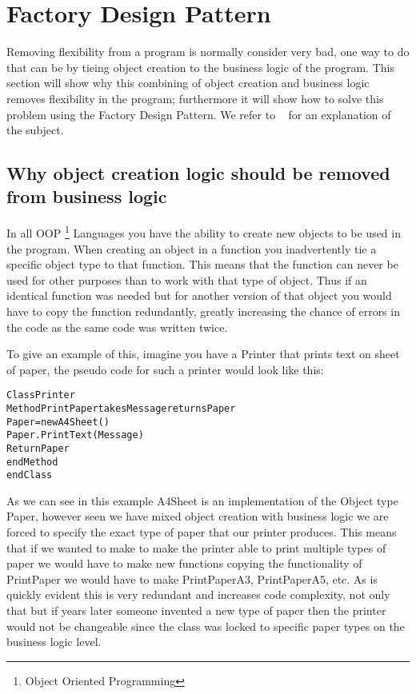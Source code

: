 
\section{Factory Design Pattern}

Removing flexibility from a program is normally consider very bad,
one way to do that can be by tieing object creation to the business
logic of the program. This section will show why this combining of
object creation and business logic removes flexibility in the program;
furthermore it will show how to solve this problem using the Factory
Design Pattern. We refer to ~\cite{WikiFactory} for an explanation
of the subject.


\subsection*{Why object creation logic should be removed from business logic}

In all OOP%
\footnote{Object Oriented Programming%
} Languages you have the ability to create new objects to be used in
the program. When creating an object in a function you inadvertently
tie a specific object type to that function. This means that the function
can never be used for other purposes than to work with that type of
object. Thus if an identical function was needed but for another version
of that object you would have to copy the function redundantly, greatly
increasing the chance of errors in the code as the same code was written
twice.

To give an example of this, imagine you have a Printer that prints
text on sheet of paper, the pseudo code for such a printer would look
like this:

\begin{alltt}
Class Printer 
    Method PrintPaper takes Message returns Paper
        Paper = new A4Sheet() 		
        Paper.PrintText(Message) 		
        Return Paper 	
    endMethod 
endClass
\end{alltt}

As we can see in this example A4Sheet is an implementation of the
Object type Paper, however seen we have mixed object creation with
business logic we are forced to specify the exact type of paper that
our printer produces. This means that if we wanted to make to make
the printer able to print multiple types of paper we would have to
make new functions copying the functionality of PrintPaper we would
have to make PrintPaperA3, PrintPaperA5, etc. As is quickly evident
this is very redundant and increases code complexity, not only that
but if years later someone invented a new type of paper then the printer
would not be changeable since the class was locked to specific paper
types on the business logic level. 


